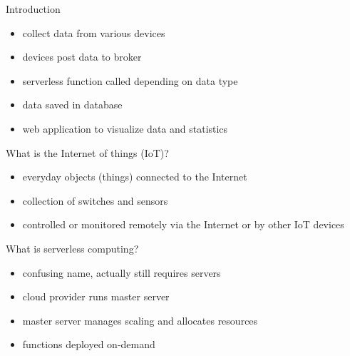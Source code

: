 \begin{frame}{Introduction}
  \begin{itemize}
    \item collect data from various devices
    \item devices post data to broker
    \item serverless function called depending on data type
    \item data saved in database
    \item web application to visualize data and statistics
  \end{itemize}
\end{frame}

\begin{frame}{What is the Internet of things (IoT)?}
  \begin{itemize}
    \item everyday objects (things) connected to the Internet
    \item collection of switches and sensors
    \item controlled or monitored remotely via the Internet or by other IoT devices
  \end{itemize}
\end{frame}

\begin{frame}{What is serverless computing?}
  \begin{itemize}
    \item confusing name, actually still requires servers
    \item cloud provider runs master server
    \item master server manages scaling and allocates resources
    \item functions deployed on-demand
  \end{itemize}
\end{frame}
